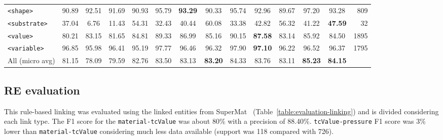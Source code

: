 \begin{table}
{\begin{tabular}{l ccc ccc ccc ccc r}
        \texttt{<shape>}       & 90.89                            & 92.51                                     & 91.69                                              & 90.93      & 95.79      & \textbf{93.29} & 90.33          & 95.74      & 92.96          & 89.67      & 97.20          & 93.28          & 809  \\
        \texttt{<substrate>}   & 37.04                            & 6.76                                      & 11.43                                              & 54.31      & 32.43      & 40.44          & 60.08          & 33.38      & 42.82          & 56.32      & 41.22          & \textbf{47.59} & 32   \\
        \texttt{<value>}       & 80.21                            & 83.15                                     & 81.65                                              & 84.81      & 89.33      & 86.99          & 85.16          & 90.15      & \textbf{87.58} & 83.14      & 85.92          & 84.50          & 1895 \\
        \texttt{<variable>}    & 96.85                            & 95.98                                     & 96.41                                              & 95.19      & 97.77      & 96.46          & 96.32          & 97.90      & \textbf{97.10} & 96.22      & 96.52          & 96.37          & 1795 \\
        \midrule
        All (micro avg)        & 81.15                            & 78.09                                     & 79.59                                              & 82.76      & 83.50      & 83.13          & \textbf{83.20} & 84.33      & 83.76          & 83.11      & \textbf{85.23} & \textbf{84.15} &      \\
        \bottomrule
    \end{tabular}
    }
    
    \label{tab:evaluation-10fold-material-parser}
\end{table}

\subsection{RE evaluation}

This rule-based linking was evaluated using the linked entities from SuperMat~\cite{foppiano2021supermat} (Table~\ref{table:evaluation-linking}) and is divided considering each link type.
The F1 score for the \texttt{material-tcValue} was about 80\% with a precision of 88.40\%. 
\texttt{tcValue-pressure} F1 score was 3\% lower than  \texttt{material-tcValue} considering much less data available (support was 118 compared with 726).


